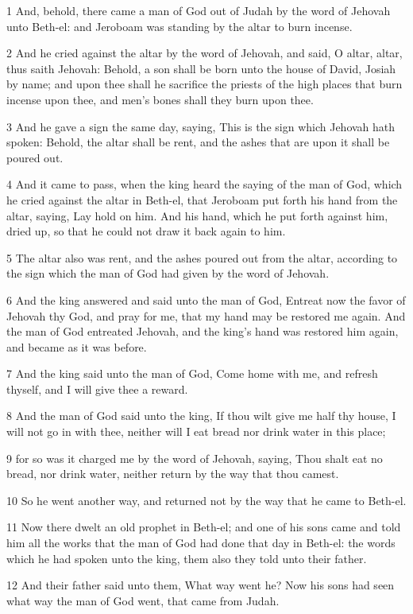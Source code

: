 \par 1 And, behold, there came a man of God out of Judah by the word of Jehovah unto Beth-el: and Jeroboam was standing by the altar to burn incense.
\par 2 And he cried against the altar by the word of Jehovah, and said, O altar, altar, thus saith Jehovah: Behold, a son shall be born unto the house of David, Josiah by name; and upon thee shall he sacrifice the priests of the high places that burn incense upon thee, and men's bones shall they burn upon thee.
\par 3 And he gave a sign the same day, saying, This is the sign which Jehovah hath spoken: Behold, the altar shall be rent, and the ashes that are upon it shall be poured out.
\par 4 And it came to pass, when the king heard the saying of the man of God, which he cried against the altar in Beth-el, that Jeroboam put forth his hand from the altar, saying, Lay hold on him. And his hand, which he put forth against him, dried up, so that he could not draw it back again to him.
\par 5 The altar also was rent, and the ashes poured out from the altar, according to the sign which the man of God had given by the word of Jehovah.
\par 6 And the king answered and said unto the man of God, Entreat now the favor of Jehovah thy God, and pray for me, that my hand may be restored me again. And the man of God entreated Jehovah, and the king's hand was restored him again, and became as it was before.
\par 7 And the king said unto the man of God, Come home with me, and refresh thyself, and I will give thee a reward.
\par 8 And the man of God said unto the king, If thou wilt give me half thy house, I will not go in with thee, neither will I eat bread nor drink water in this place;
\par 9 for so was it charged me by the word of Jehovah, saying, Thou shalt eat no bread, nor drink water, neither return by the way that thou camest.
\par 10 So he went another way, and returned not by the way that he came to Beth-el.
\par 11 Now there dwelt an old prophet in Beth-el; and one of his sons came and told him all the works that the man of God had done that day in Beth-el: the words which he had spoken unto the king, them also they told unto their father.
\par 12 And their father said unto them, What way went he? Now his sons had seen what way the man of God went, that came from Judah.
